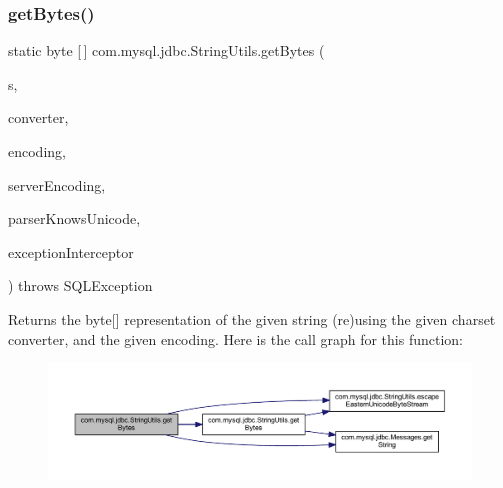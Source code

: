 \subsubsection{\texorpdfstring{get\+Bytes()}{getBytes()}\hspace{0.1cm}{\footnotesize\ttfamily [4/7]}}
{\footnotesize\ttfamily static byte \mbox{[}$\,$\mbox{]} com.\+mysql.\+jdbc.\+String\+Utils.\+get\+Bytes (\begin{DoxyParamCaption}\item[{String}]{s,  }\item[{\mbox{\hyperlink{classcom_1_1mysql_1_1jdbc_1_1_single_byte_charset_converter}{Single\+Byte\+Charset\+Converter}}}]{converter,  }\item[{String}]{encoding,  }\item[{String}]{server\+Encoding,  }\item[{boolean}]{parser\+Knows\+Unicode,  }\item[{\mbox{\hyperlink{interfacecom_1_1mysql_1_1jdbc_1_1_exception_interceptor}{Exception\+Interceptor}}}]{exception\+Interceptor }\end{DoxyParamCaption}) throws S\+Q\+L\+Exception\hspace{0.3cm}{\ttfamily [static]}}

Returns the byte\mbox{[}\mbox{]} representation of the given string (re)using the given charset converter, and the given encoding. Here is the call graph for this function\+:
\nopagebreak
\begin{figure}[H]
\begin{center}
\leavevmode
\includegraphics[width=350pt]{classcom_1_1mysql_1_1jdbc_1_1_string_utils_a7ccf9deb162f278f270b455040e8aa03_cgraph}
\end{center}
\end{figure}
\mbox{\label{classcom_1_1mysql_1_1jdbc_1_1_string_utils_a08b655dc82143b3bff5c4af85cafb9c0}} 
